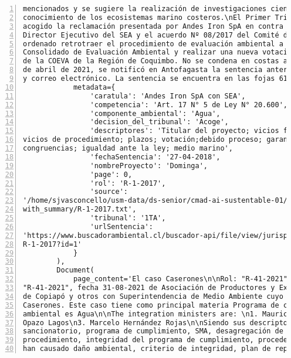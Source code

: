 \begin{Verbatim}[frame=lines, label=Elavoración propia -  Ejemplo de Contexto enviado por el Chatbot a OpenAI
				, fontsize=\footnotesize, numbers=left
				, baselinestretch=0.4
				, formatcom=\color{gray}]
mencionados y se sugiere la realización de investigaciones científicas para incrementar el
conocimiento de los ecosistemas marino costeros.\nEl Primer Tribunal Ambiental de Chile ha
acogido la reclamación presentada por Andes Iron SpA en contra de la Resolución 1146 del
Director Ejecutivo del SEA y el acuerdo Nº 08/2017 del Comité de Ministros. El tribunal ha
ordenado retrotraer el procedimiento de evaluación ambiental a la etapa posterior al Informe
Consolidado de Evaluación Ambiental y realizar una nueva votación ajustada a derecho por parte
de la COEVA de la Región de Coquimbo. No se condena en costas a las partes.\nResumen:\n\nEl 16
de abril de 2021, se notificó en Antofagasta la sentencia anterior a través del estado diario
y correo electrónico. La sentencia se encuentra en las fojas 6156.',
            metadata={
                'caratula': 'Andes Iron SpA con SEA',
                'competencia': 'Art. 17 N° 5 de Ley N° 20.600',
                'componente_ambiental': 'Agua',
                'decision_del_tribunal': 'Acoge',
                'descriptores': 'Titular del proyecto; vicios formales; motivaciòn; nulidad;
vicios de procedimiento; plazos; votación;debido proceso; garantías; contradictoriedad;
congruencias; igualdad ante la ley; medio marino',
                'fechaSentencia': '27-04-2018',
                'nombreProyecto': 'Dominga',
                'page': 0,
                'rol': 'R-1-2017',
                'source':
'/home/sjvasconcello/usm-data/ds-senior/cmad-ai-sustentable-01/etl/load/../../data/clean/docs_
with_summary/R-1-2017.txt',
                'tribunal': '1TA',
                'urlSentencia':
'https://www.buscadorambiental.cl/buscador-api/file/view/jurisprudencia/S1TA Rol N°
R-1-2017?id=1'
            }
        ),
        Document(
            page_content='El caso Caserones\n\nRol: "R-41-2021", Rol: "R-41-2021",Rol:
"R-41-2021", fecha 31-08-2021 de Asociación de Productores y Exportadores Agrícolas del Valle
de Copiapó y otros con Superintendencia de Medio Ambiente cuyo proyecto corresponde a Proyecto
Caserones. Este caso tiene como principal materia Programa de cumplimiento SMA y su coponente
ambiental es Agua\n\nThe integration ministers are: \n1. Mauricio Oviedo Gutiérrez\n2. Juan
Opazo Lagos\n3. Marcelo Hernández Rojas\n\nSiendo sus descriptores: Procedimiento
sancionatorio, programa de cumplimiento, SMA, desagregación de cargos, desviación del
procedimiento, integridad del programa de cumplimiento, procedencia del PDC, infracciones que
han causado daño ambiental, criterio de integridad, plan de reparación ambiental, incentivos

\end{Verbatim}
